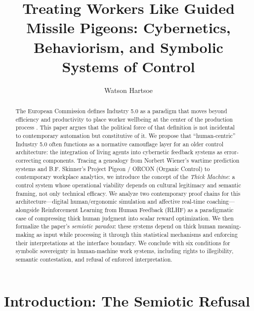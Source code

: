 \documentclass[runningheads]{llncs}
\begin{document}
\title{Treating Workers Like Guided Missile Pigeons: Cybernetics, Behaviorism, and Symbolic Systems of Control}

\author{Watson Hartsoe}

\maketitle

\begin{abstract}
The European Commission defines Industry 5.0 as a paradigm that moves beyond efficiency and productivity to place worker wellbeing at the center of the production process \cite{breque2021industry}. This paper argues that the political force of that definition is not incidental to contemporary automation but constitutive of it. We propose that ``human-centric'' Industry 5.0 often functions as a normative camouflage layer for an older control architecture: the integration of living agents into cybernetic feedback systems as error-correcting components. Tracing a genealogy from Norbert Wiener's wartime prediction systems and B.F. Skinner's Project Pigeon / ORCON (Organic Control) to contemporary workplace analytics, we introduce the concept of the \emph{Thick Machine}: a control system whose operational viability depends on cultural legitimacy and semantic framing, not only technical efficacy. We analyze two contemporary proof chains for this architecture---digital human/ergonomic simulation and affective real-time coaching---alongside Reinforcement Learning from Human Feedback (RLHF) as a paradigmatic case of compressing thick human judgment into scalar reward optimization. We then formalize the paper's \emph{semiotic paradox}: these systems depend on thick human meaning-making as input while processing it through thin statistical mechanisms and enforcing their interpretations at the interface boundary. We conclude with six conditions for symbolic sovereignty in human-machine work systems, including rights to illegibility, semantic contestation, and refusal of enforced interpretation.

\end{abstract}

\section{Introduction: The Semiotic Refusal}
\end{document}
